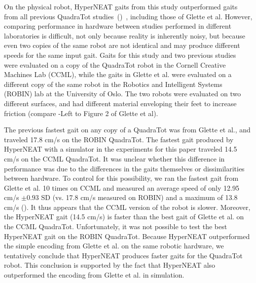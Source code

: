 On the physical robot, HyperNEAT gaits from this study outperformed gaits from all previous QuadraTot studies~()~\cite{yos:clune,glette,haocheng}, including those of Glette et al. 
 However, comparing performance in hardware between studies performed in
different laboratories is difficult, not only because reality is
inherently noisy, but because even two copies of the same robot are
not identical and may produce different speeds for the same input
gait. Gaits for this study and two previous studies~\cite{yos:clune,haocheng} were evaluated on a copy of the QuadraTot robot in the Cornell Creative Machines Lab (CCML), while the gaits in Glette et al. were evaluated on a different copy of the same robot in the Robotics and
Intelligent Systems (ROBIN) lab at the University of Oslo. The two robots were evaluated on two different surfaces, and had different material enveloping their feet to increase friction (compare -Left to Figure 2 of Glette et al). 

The previous fastest gait on any copy of a QuadraTot was from Glette
et al., and traveled 17.8 cm/s on the ROBIN QuadraTot. The
fastest gait produced by HyperNEAT with a simulator in the experiments for this paper traveled 14.5
cm/s on the CCML QuadraTot. It was unclear whether this difference in performance was due to
the differences in the gaits themselves or dissimilarities between
hardware. To control for this possibility, we ran the fastest gait
from Glette et al. 10 times on CCML and measured an average speed of
only 12.95 cm/s $\pm0.93$ SD (vs. 17.8 cm/s measured on ROBIN) and a maximum of
13.8 cm/s (). It thus appears that the CCML version of the robot is slower. Moreover, the HyperNEAT gait (14.5 cm/s) is faster than the best gait of Glette et al. on the CCML QuadraTot. Unfortunately, it was not possible to test the best HyperNEAT gait on the ROBIN QuadraTot. Because HyperNEAT outperformed the simple encoding from Glette et al. on the same robotic hardware, we tentatively
conclude that HyperNEAT produces faster gaits for the QuadraTot robot. This conclusion is supported by the fact that HyperNEAT also outperformed the encoding from Glette et al. in simulation. 

